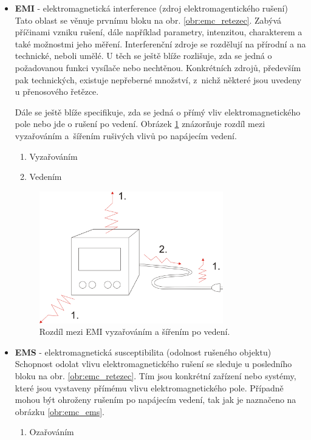\begin{itemize}
\item {\bf EMI} - elektromagnetická interference (zdroj elektromagentického rušení) \\
Tato oblast se věnuje prvnímu bloku na obr. \ref{obr:emc_retezec}. Zabývá příčinami vzniku rušení, dále například parametry, intenzitou, charakterem a také možnostmi jeho měření. Interferenční zdroje se rozdělují na přírodní a na technické, neboli umělé. U těch se ještě blíže rozlišuje, zda se jedná o požadovanou funkci vysílače nebo nechtěnou. Konkrétních zdrojů, především pak technických, existuje nepřeberné množství, z~nichž některé jsou uvedeny u přenosového řetězce.

Dále se ještě blíže specifikuje, zda se jedná o přímý vliv elektromagnetického pole nebo jde o rušení po vedení. Obrázek \ref{obr:emc_emi} znázorňuje rozdíl mezi vyzařováním a~šířením rušivých vlivů po napájecím vedení.
	\begin{enumerate}
	\item Vyzařováním
	\item Vedením
	\end{enumerate}
	\begin{figure}[!h]
	\centering
	\includegraphics[width=8cm]{emc_emi.png}
	\caption{Rozdíl mezi EMI vyzařováním a šířením po vedení.}
	\label{obr:emc_emi}
	\end{figure}
\item {\bf EMS} - elektromagnetická susceptibilita (odolnost rušeného objektu) \\
Schopnost odolat vlivu elektromagnetického rušení se sleduje u posledního bloku na obr. \ref{obr:emc_retezec}. Tím jsou konkrétní zařízení nebo systémy, které jsou vystaveny přímému vlivu elektromagnetického pole. Případně mohou být ohroženy rušením po napájecím vedení, tak jak je naznačeno na obrázku \ref{obr:emc_ems}.
	\begin{enumerate}
	\item Ozařováním

\end{enumerate}
\end{itemize}

